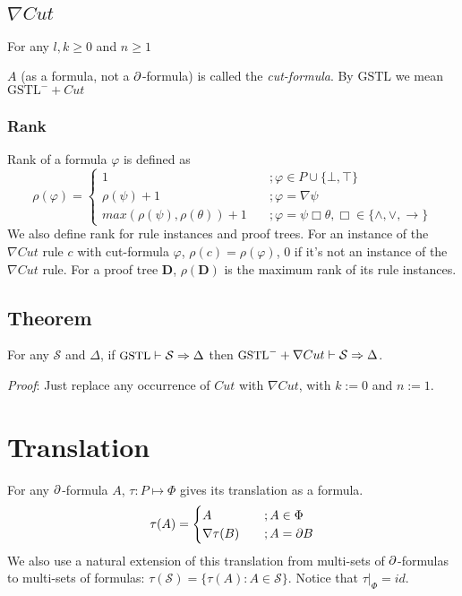 \subsection{$\nabla Cut$} For any $l,k \ge 0$ and $n \ge 1$
\begin{prooftree}
\end{prooftree}
$A$ (as a formula, not a $\p$-formula) is called the \textit{cut-formula}.
By $\text{GSTL}$ we mean $\text{GSTL}^- + Cut$
\subsubsection{Rank} Rank of a formula $\varphi$ is defined as
\[ \rho(\varphi) = \begin{cases}
1 & \quad ; \varphi \in P \cup \{ \bot, \top \} \\
\rho(\psi) + 1 & \quad ; \varphi = \nabla \psi \\
max(\rho(\psi), \rho(\theta)) + 1 & \quad ; \varphi = \psi \Box \theta, \Box \in \{ \land , \lor, \rightarrow \}
\end{cases} \]
We also define rank for rule instances and proof trees. For an instance of the $\nabla Cut$ rule $c$ with cut-formula $\varphi$, $\rho(c) = \rho(\varphi)$, $0$ if it's not an instance of the $\nabla Cut$ rule.
For a proof tree $\mathbf{D}$, $\rho(\mathbf{D})$ is the maximum rank of its rule instances.

\subsection{Theorem} For any $\mathcal{S}$ and $\Delta$, if $\small\text{GSTL} \vdash \mathcal{S} \Rightarrow \Delta$ then $\small\text{GSTL}^- + \nabla Cut \vdash \mathcal{S} \Rightarrow \Delta$.

\textit{Proof}: Just replace any occurrence of $Cut$ with $\nabla Cut$, with $k := 0$ and $n := 1$.

\section{Translation} For any $\p$-formula $A$, $\tau : P \mapsto \Phi$ gives its translation as a formula.
\[ \tau(A) = \begin{cases}
	A & \quad ; A \in \Phi \\
	\nabla \tau(B) & \quad ; A = \p B
\end{cases} \]
We also use a natural extension of this translation from multi-sets of $\p$-formulas to multi-sets of formulas: $\tau(\mathcal{S}) = \{ \tau(A) : A \in \mathcal{S} \}$. Notice that $\tau|_\Phi = id$.

